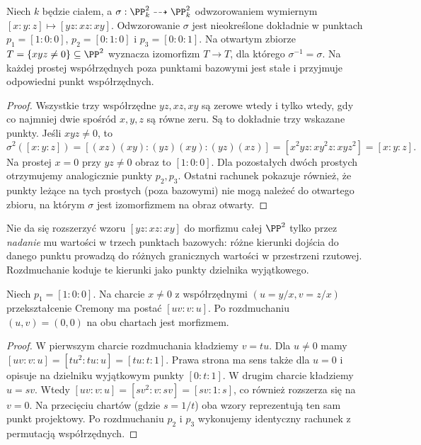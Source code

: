 \begin{stwierdzenie}
\label{st:ga8-cremona-basic}
Niech $k$ będzie ciałem, a
$\sigma:\PP^2_k\dashrightarrow\PP^2_k$ odwzorowaniem wymiernym
$[x:y:z]\mapsto[yz:xz:xy]$.
Odwzorowanie $\sigma$ jest nieokreślone dokładnie w punktach
$p_1=[1:0:0]$, $p_2=[0:1:0]$ i $p_3=[0:0:1]$.
Na otwartym zbiorze $T=\{xyz\ne0\}\subseteq\PP^2$
wyznacza izomorfizm $T\to T$, dla którego
$\sigma^{-1}=\sigma$. Na każdej prostej współrzędnych
poza punktami bazowymi jest stałe i przyjmuje
odpowiedni punkt współrzędnych.
\end{stwierdzenie}
\begin{proof}
Wszystkie trzy współrzędne $yz,xz,xy$ są zerowe
wtedy i tylko wtedy, gdy co najmniej dwie spośród
$x,y,z$ są równe zeru. Są to dokładnie trzy wskazane
punkty. Jeśli $xyz\ne0$, to
\[
\sigma^2([x:y:z])
=[(xz)(xy):(yz)(xy):(yz)(xz)]
=[x^2yz:xy^2z:xyz^2]=[x:y:z].
\]
Na prostej $x=0$ przy $yz\ne0$ obraz to $[1:0:0]$.
Dla pozostałych dwóch prostych otrzymujemy analogicznie
punkty $p_2,p_3$. Ostatni rachunek pokazuje również,
że punkty leżące na tych prostych (poza bazowymi)
nie mogą należeć do otwartego zbioru, na którym
$\sigma$ jest izomorfizmem na obraz otwarty.
\end{proof}

\begin{uwaga}
Nie da się rozszerzyć wzoru $[yz:xz:xy]$ do morfizmu
całej $\PP^2$ tylko przez \emph{nadanie} mu wartości
w trzech punktach bazowych: różne kierunki dojścia
do danego punktu prowadzą do różnych granicznych
wartości w przestrzeni rzutowej. Rozdmuchanie koduje
te kierunki jako punkty dzielnika wyjątkowego.
\end{uwaga}

\begin{stwierdzenie}
\label{st:ga8-local-resolution}
Niech $p_1=[1:0:0]$. Na charcie $x\ne0$ z
współrzędnymi $(u=y/x,v=z/x)$ przekształcenie Cremony
ma postać $[uv:v:u]$. Po rozdmuchaniu $(u,v)=(0,0)$
na obu chartach jest morfizmem.
\end{stwierdzenie}
\begin{proof}
W pierwszym charcie rozdmuchania kładziemy $v=tu$.
Dla $u\ne0$ mamy
$[uv:v:u]=[tu^2:tu:u]=[tu:t:1]$.
Prawa strona ma sens także dla $u=0$ i opisuje
na dzielniku wyjątkowym punkty $[0:t:1]$.
W drugim charcie kładziemy $u=sv$. Wtedy
$[uv:v:u]=[sv^2:v:sv]=[sv:1:s]$,
co również rozszerza się na $v=0$.
Na przecięciu chartów (gdzie $s=1/t$)
oba wzory reprezentują ten sam punkt projektowy.
Po rozdmuchaniu $p_2$ i $p_3$ wykonujemy identyczny
rachunek z permutacją współrzędnych.
\end{proof}

